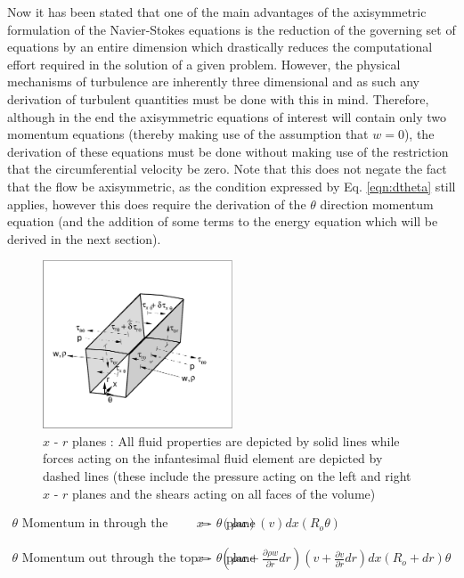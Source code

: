 	Now it has been stated that one of the main advantages of the axisymmetric formulation of the Navier-Stokes 
equations is the reduction of the governing set of equations by an entire dimension which drastically reduces 
the computational effort required in the solution of a given problem.  However, the physical mechanisms of 
turbulence are inherently three dimensional and as such any derivation of turbulent quantities must be done 
with this in mind.  Therefore, although in the end the axisymmetric equations of interest will contain only 
two momentum equations (thereby making use of the assumption that $w = 0$), the derivation of these equations 
must be done without making use of the restriction that the circumferential velocity be zero.  Note that this 
does not negate the fact that the flow be axisymmetric, as the condition expressed by Eq. \ref{eqn:dtheta} 
still applies, however this does require the derivation of the $\theta$ direction momentum equation (and the 
addition of some terms to the energy equation which will be derived in the next section).
	

\begin{figure}[ht]
\includegraphics[height=5cm]{./thetadir.eps}
\caption[$x$ - $r$ planes]{$x$ - $r$ planes : All fluid properties are depicted by solid lines while 
				forces acting on the infantesimal fluid element are depicted by dashed lines (these include
				the pressure acting on the left and right $x$ - $r$ planes
				and the shears acting on all faces of the volume)}
\label{fig:thetadir}
\end{figure}

\begin{displaymath}
	\begin{array}{ccc}
		\textrm{$\theta$ Momentum in through the bottom $x$ - $\theta$ plane} &
		= & (\rho w)(v)dx(R_o \theta)\\
 		& \\ & \\
		\textrm{$\theta$ Momentum out through the top $x$ - $\theta$ plane} &
		= & (\rho w + \frac{\partial \rho w}{\partial r}dr)(v + \frac{\partial v}{\partial r}dr)dx
		(R_o + dr) \theta 
	\end{array}
\end{displaymath}

